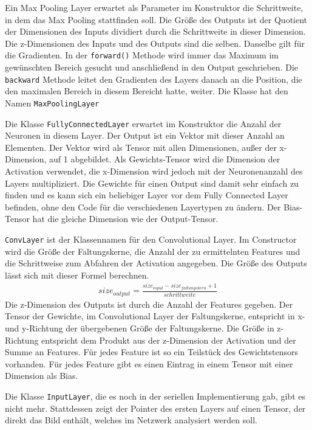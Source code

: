 \documentclass[../main.tex]{subfiles}
\begin{document}
Ein Max Pooling Layer erwartet als Parameter im Konstruktor die Schrittweite, in dem das Max Pooling stattfinden soll. Die Größe des Outputs ist der Quotient der Dimensionen des Inputs dividiert durch die Schrittweite in dieser Dimension. Die z-Dimensionen des Inputs und des Outputs sind die selben. Dasselbe gilt für die Gradienten. In der \texttt{forward()} Methode wird immer das Maximum im gewünschten Bereich gesucht und anschließend in den Output geschrieben. Die \texttt{backward} Methode leitet den Gradienten des Layers danach an die Position, die den maximalen Bereich in diesem Bereicht hatte, weiter. Die Klasse hat den Namen \texttt{MaxPoolingLayer}

Die Klasse \texttt{FullyConnectedLayer} erwartet im Konstruktor die Anzahl der Neuronen in diesem Layer. Der Output ist ein Vektor mit dieser Anzahl an Elementen. Der Vektor wird als Tensor mit allen Dimensionen, außer der x-Dimension, auf 1 abgebildet. Als Gewichts-Tensor wird die Dimension der Activation verwendet, die x-Dimension wird jedoch mit der Neuronenanzahl des Layers multipliziert. Die Gewichte für einen Output sind damit sehr einfach zu finden und es kann sich ein beliebiger Layer vor dem Fully Connected Layer befinden, ohne den Code für die verschiedenen Layertypen zu ändern. Der Bias-Tensor hat die gleiche Dimension wie der Output-Tensor.

\texttt{ConvLayer} ist der Klassennamen für den Convolutional Layer. Im Constructor wird die Größe der Faltungskerne, die Anzahl der zu ermittelnten Features und die Schrittweise zum Abfahren der Activation angegeben. Die Größe des Outputs lässt sich mit dieser Formel berechnen.
\begin{equation}\label{eq:cnn_outout_size}
\begin{split}
size_{output} = \frac{size_{input} -size_{faltungskern} +1}{schrittweite}
\end{split}
\end{equation}
Die z-Dimension des Outputs ist durch die Anzahl der Features gegeben. Der Tensor der Gewichte, im Convolutional Layer der Faltungskerne, entspricht in x- und y-Richtung der übergebenen Größe der Faltungskerne. Die Größe in z-Richtung entspricht dem Produkt aus der z-Dimension der Activation und der Summe an Features. Für jedes Feature ist so ein Teilstück des Gewichtstensors vorhanden. Für jedes Feature gibt es einen Eintrag in einem Tensor mit einer Dimension als Bias.

Die Klasse \texttt{InputLayer}, die es noch in der seriellen Implementierung gab, gibt es nicht mehr. Stattdessen zeigt der Pointer des ersten Layers auf einen Tensor, der direkt das Bild enthält, welches im Netzwerk analysiert werden soll.
\end{document}
